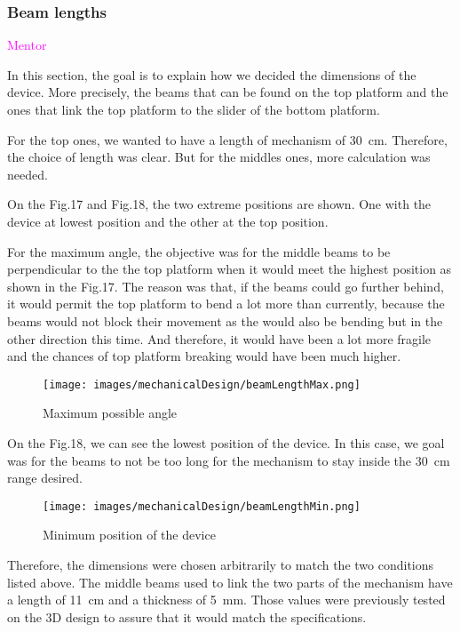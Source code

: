 \documentclass[lettersize,journal]{IEEEtran}
\begin{document}
\bigskip

\subsubsection{Beam lengths } \textcolor{magenta}{Mentor}

In this section, the goal is to explain how we decided the dimensions of the device. More precisely, the beams that can be found on the top platform and the ones that link the top platform to the slider of the bottom platform.

For the top ones, we wanted to have a length of mechanism of \SI{30}{cm}. Therefore, the choice of length was clear. But for the middles ones, more calculation was needed.


On the Fig.17 and Fig.18, the two extreme positions are shown. One with the device at lowest position and the other at the top position. 


For the maximum angle, the objective was for the middle beams to be perpendicular to the the top platform when it would meet the highest position as shown in the Fig.17. The reason was that, if the beams could go further behind, it would permit the top platform to bend a lot more than currently, because the beams would not block their movement as the would also be bending but in the other direction this time. And therefore, it would have been a lot more fragile and the chances of top platform breaking would have been much higher. 


\begin{figure}[!h]
    \centering
    \texttt{[image: images/mechanicalDesign/beamLengthMax.png]}
    \caption{\centering Maximum possible angle}
    \label{fig:Mechanical_placement}
\end{figure}


On the Fig.18, we can see the lowest position of the device. In this case, we goal was for the beams to not be too long for the mechanism to stay inside the \SI{30}{cm} range desired.


\begin{figure}[!h]
    \centering
    \texttt{[image: images/mechanicalDesign/beamLengthMin.png]}
    \caption{\centering Minimum position of the device}
    \label{fig:Mechanical_placement}
\end{figure}


Therefore, the dimensions were chosen arbitrarily to match the two conditions listed above. The middle beams used to link the two parts of the mechanism have a length of \SI{11}{cm} and a thickness of \SI{5}{mm}. Those values were previously tested on the 3D design to assure that it would match the specifications. 
\end{document}

